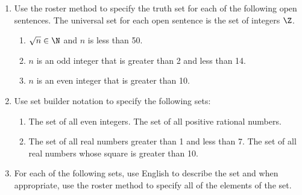 \begin{enumerate}
\item \label{exer:sec23-4new} Use the roster method to specify the truth set for each of the following open sentences.  The universal set for each open sentence is the set of integers $\Z$.
\begin{enumerate}
\yitem $n + 7 = 4$.
\yitem $n^2 = 64$.
\item $\sqrt{n} \in \N$ and $n$ is less than 50.
\item $n$ is an odd integer that is greater than 2 and less than 14.
\item $n$ is an even integer that is greater than 10.
\end{enumerate}

%
\item Use set builder notation to specify the following sets: \label{exer:sec21-3}
  \begin{enumerate}
    \yitem The set of all integers greater than or equal to 5.
    \item The set of all even integers.
    \yitem The set of all positive rational numbers.
    \item The set of all real numbers greater than 1 and less than 7.
    \yitem The set of all real numbers whose square is greater than 10.
  \end{enumerate}
%
\item For each of the following sets, use English to describe the set and when appropriate,  use the roster method to specify all of the elements of the set.\label{exer:sec23-sets}
\begin{enumerate}
\end{enumerate}
\end{enumerate}


